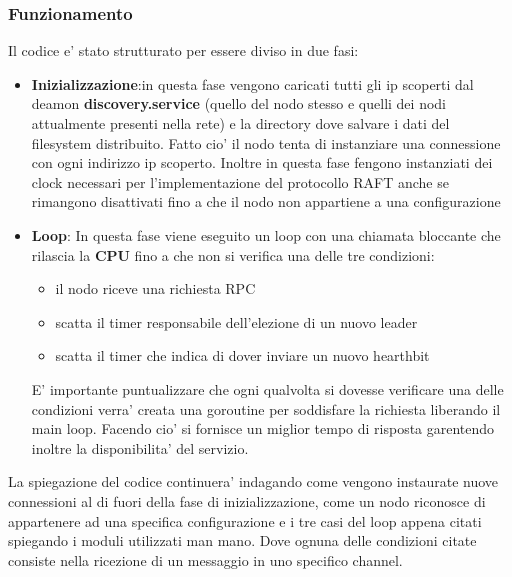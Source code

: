 \subsubsection{Funzionamento}
Il codice e' stato strutturato per essere diviso in due fasi: 
\begin{itemize}
    \item \textbf{Inizializzazione}:in questa fase vengono caricati tutti gli ip scoperti dal deamon
        \textbf{discovery.service} (quello del nodo stesso e quelli dei nodi attualmente presenti 
        nella rete) e la directory dove salvare i dati del filesystem distribuito. Fatto cio'
        il nodo tenta di instanziare una connessione con ogni indirizzo ip scoperto.
        Inoltre in questa fase fengono instanziati dei clock necessari per l'implementazione 
        del protocollo RAFT anche se rimangono disattivati fino a che il nodo non appartiene a una
        configurazione
    \item \textbf{Loop}: In questa fase viene eseguito un loop con una chiamata bloccante che 
        rilascia la \textbf{CPU} fino a che non si verifica una delle tre condizioni:
        \begin{itemize}
            \item il nodo riceve una richiesta RPC
            \item scatta il timer responsabile dell'elezione di un nuovo leader
            \item scatta il timer che indica di dover inviare un nuovo hearthbit
        \end{itemize}
        E' importante puntualizzare che ogni qualvolta si dovesse verificare una delle condizioni
        verra' creata una goroutine per soddisfare la richiesta liberando il main loop.
        Facendo cio' si fornisce un miglior tempo di risposta garentendo inoltre la disponibilita' 
        del servizio.
\end{itemize}
La spiegazione del codice continuera' indagando come vengono instaurate nuove connessioni 
al di fuori della fase di inizializzazione, come un nodo riconosce di appartenere ad una specifica
configurazione e i tre casi del loop appena citati spiegando i moduli utilizzati man mano. 
Dove ognuna delle condizioni citate consiste nella ricezione di un messaggio in uno specifico 
channel.

